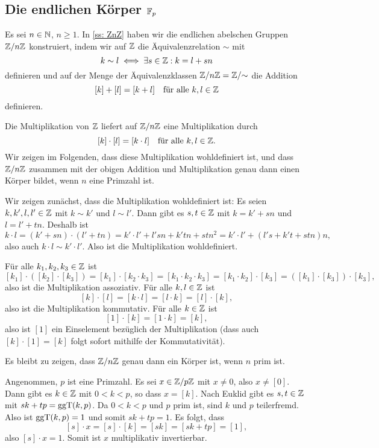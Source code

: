 \subsection{Die endlichen Körper \texorpdfstring{$\mathbb{F}_p$}{Fp}}
Es sei $n \in \mathbb{N}$, $n \geq 1$. In \ref{ss: ZnZ} haben wir die endlichen abelschen Gruppen $\mathbb{Z}/n\mathbb{Z}$ konstruiert, indem wir auf $\mathbb{Z}$ die Äquivalenzrelation $\sim$ mit
\[
 k \sim l \iff \exists s \in \mathbb{Z} : k = l + sn
\]
definieren und auf der Menge der Äquivalenzklassen $\mathbb{Z}/n\mathbb{Z} = \mathbb{Z}/{\sim}$ die Addition
\[
 [k] + [l] = [k+l]
 \quad
 \text{für alle $k,l \in \mathbb{Z}$}
\]
definieren.

Die Multiplikation von $\mathbb{Z}$ liefert auf $\mathbb{Z}/n\mathbb{Z}$ eine Multiplikation durch
\[
 [k] \cdot [l] = [k \cdot l]
 \quad
 \text{für alle $k,l \in \mathbb{Z}$}.
\]
Wir zeigen im Folgenden, dass diese Multiplikation wohldefiniert ist, und dass $\mathbb{Z}/n\mathbb{Z}$ zusammen mit der obigen Addition und Multiplikation genau dann einen Körper bildet, wenn $n$ eine Primzahl ist.

Wir zeigen zunächst, dass die Multiplikation wohldefiniert ist: Es seien $k, k', l, l' \in \mathbb{Z}$ mit $k \sim k'$ und $l \sim l'$. Dann gibt es $s,t \in \mathbb{Z}$ mit $k = k' + sn$ und $l = l' + tn$. Deshalb ist
\[
 k \cdot l
 = (k' + sn) \cdot (l' + tn)
 = k' \cdot l' + l'sn + k'tn + stn^2
 = k' \cdot l' + (l's + k't + stn)n,
\]
also auch $k \cdot l \sim k' \cdot l'$. Also ist die Multiplikation wohldefiniert.

Für alle $k_1, k_2, k_3 \in \mathbb{Z}$ ist
\[
 [k_1] \cdot ([k_2] \cdot [k_3])
 = [k_1] \cdot [k_2 \cdot k_3]
 = [k_1 \cdot k_2 \cdot k_3]
 = [k_1 \cdot k_2] \cdot [k_3]
 = ([k_1] \cdot [k_3]) \cdot [k_3],
\]
also ist die Multiplikation assoziativ. Für alle $k, l \in \mathbb{Z}$ ist
\[
 [k] \cdot [l]
 = [k \cdot l]
 = [l \cdot k]
 = [l] \cdot [k],
\]
also ist die Multiplikation kommutativ. Für alle $k \in \mathbb{Z}$ ist
\[
 [1] \cdot [k] = [1 \cdot k] = [k],
\]
also ist $[1]$ ein Einselement bezüglich der Multiplikation (dass auch $[k] \cdot [1] = [k]$ folgt sofort mithilfe der Kommutativität).

Es bleibt zu zeigen, dass $\mathbb{Z}/n\mathbb{Z}$ genau dann ein Körper ist, wenn $n$ prim ist.

Angenommen, $p$ ist eine Primzahl. Es sei $x \in \mathbb{Z}/p\mathbb{Z}$ mit $x \neq 0$, also $x \neq [0]$. Dann gibt es $k \in \mathbb{Z}$ mit $0 < k < p$, so dass $x = [k]$. Nach Euklid gibt es $s,t \in \mathbb{Z}$ mit $sk + tp = \mathrm{ggT}(k,p)$. Da $0 < k < p$ und $p$ prim ist, sind $k$ und $p$ teilerfremd. Also ist $\mathrm{ggT}(k,p) = 1$ und somit $sk + tp = 1$. Es folgt, dass
\[
 [s] \cdot x
 = [s] \cdot [k]
 = [sk]
 = [sk + tp]
 = [1],
\]
also $[s] \cdot x = 1$. Somit ist $x$ multiplikativ invertierbar.

